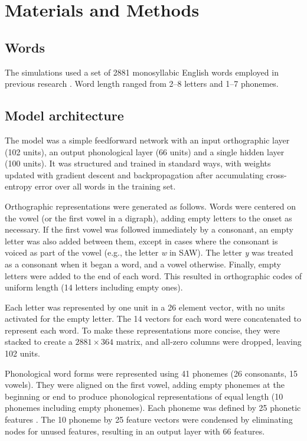 \documentclass[10pt,letterpaper]{article}
\newcommand{\exword}[1]{\MakeUppercase{#1}}
\newcommand{\gorl}{letter}
\newcommand{\gorls}{\gorl{}s}
\newcommand{\xy}[2]{$#1\times#2$}
\begin{document}
\section{Materials and Methods}

\subsection{Words}

The simulations used a set of 2881 monosyllabic English words employed in previous research \cite{Harm1999}. Word length ranged from 2--8 letters and 1--7 phonemes.

\subsection{Model architecture}

The model was a simple feedforward network with an input orthographic layer (102 units), an output phonological layer (66 units) and a single hidden layer (100 units). It was structured and trained in standard ways, with weights updated with gradient descent and backpropagation after accumulating cross-entropy error over all words in the training set. 

Orthographic representations were generated as follows. Words were centered on the vowel (or the first vowel in a digraph), adding empty \gorls{} to the onset as necessary. If the first vowel was followed immediately by a consonant, an empty \gorl{} was also added between them, except in cases where the consonant is voiced as part of the vowel (e.g., the letter \textit{w} in \exword{saw}). The letter \textit{y} was treated as a consonant when it began a word, and a vowel otherwise. Finally, empty \gorls{} were added to the end of each word. This resulted in orthographic codes of uniform length (14 \gorls{} including empty ones).

Each \gorl{} was represented by one unit in a 26 element vector, with no units activated for the empty \gorl{}. The 14 vectors for each word were concatenated to represent each word. To make these representations more concise, they were stacked to create a \xy{2881}{364} matrix, and all-zero columns were dropped, leaving 102 units.

Phonological word forms were represented using 41 phonemes (26 consonants, 15 vowels).  They were aligned on the first vowel, adding empty phonemes at the beginning or end to produce phonological representations of equal length (10 phonemes including empty phonemes). Each phoneme was defined by 25 phonetic features \cite{Harm1999}. The 10 phoneme by 25 feature vectors were condensed by eliminating nodes for unused features, resulting in an output layer with 66 features.
\end{document}
